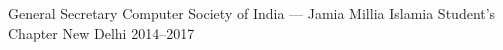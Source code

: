 
\begin{cvhonours}

\cvhonour%
  {General Secretary} %
  {Computer Society of India --- Jamia Millia Islamia Student's Chapter} %
  {New Delhi} %
  {2014--2017} %

\end{cvhonours}
